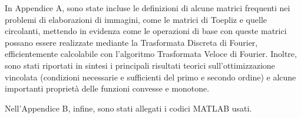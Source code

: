 In Appendice A, sono state incluse le definizioni di alcune matrici frequenti nei problemi di elaborazioni di immagini, come le matrici di Toepliz e quelle circolanti, mettendo in evidenza come le operazioni di base con queste matrici possano essere realizzate mediante la Trasformata Discreta di Fourier, efficientemente calcolabile con l'algoritmo Trasformata Veloce di Fourier. Inoltre, sono stati riportati in sintesi i principali risultati teorici sull'ottimizzazione vincolata (condizioni necessarie e sufficienti del primo e secondo ordine) e alcune importanti propriet\`{a} delle funzioni
convesse e monotone.

Nell'Appendice B, infine, sono stati allegati i codici MATLAB usati. 